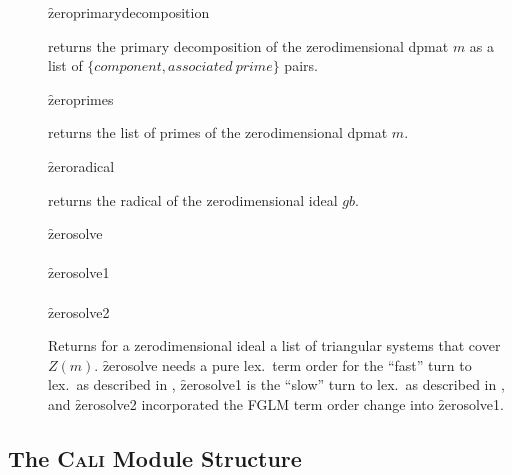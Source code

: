 \begin{description}
\item[]
  \begin{syntax}
    \f{zeroprimarydecomposition} 
  \end{syntax}
  \hypertarget{operator:ZEROPRIMARYDECOMPOSITION}{}
returns the primary decomposition of the zerodimensional dpmat
$m$ as a list of $\{component, associated\ prime\}$ pairs.

\item[]
  \begin{syntax}
    \f{zeroprimes} 
  \end{syntax}
  \hypertarget{operator:ZEROPRIMES}{}
returns the list of primes of the zerodimensional dpmat $m$.

\item[]
  \begin{syntax}
    \f{zeroradical} 
  \end{syntax}
  \hypertarget{operator:ZERORADICAL}{}
returns the radical of the zerodimensional ideal $gb$.

\item[]
  \begin{syntaxtable}
    \f{zerosolve}  \\
     \\
    \f{zerosolve1}  \\
     \\
    \f{zerosolve2} 
  \end{syntaxtable}
  \hypertarget{operator:ZEROSOLVE}{}
  \hypertarget{operator:ZEROSOLVE1}{}
  \hypertarget{operator:ZEROSOLVE2}{}
Returns for a zerodimensional ideal a list of triangular systems
that cover $Z(m)$. \f{zerosolve} needs a pure lex.\ term order for
the ``fast'' turn to lex.\ as described in \cite{Moeller:93}, \f{zerosolve1}
is the ``slow'' turn to lex.\ as described in \cite{Graebe:95b},
and \f{zerosolve2} incorporated the FGLM term order change into \f{zerosolve1}.
\end{description}
\pagebreak


\subsection{The \textsc{Cali} Module Structure}


